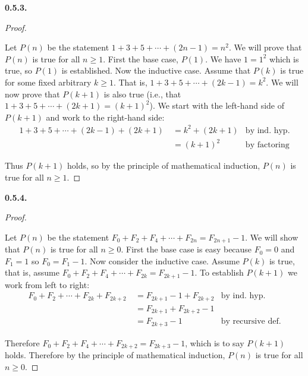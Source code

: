 \documentclass[10pt,]{book}
\theoremstyle{plain}
\theoremstyle{definition}
\theoremstyle{definition}
\theoremstyle{definition}
\theoremstyle{definition}
\numberwithin{equation}{chapter}
\newcommand{\amp}{&}
\begin{document}
\par\smallskip
\noindent\textbf{0.5.3.} \begin{proof}\hypertarget{proof-7}{}
\hypertarget{p-439}{}%
Let \(P(n)\) be the statement \(1+3 +5 + \cdots + (2n-1) = n^2\). We will prove that \(P(n)\) is true for all \(n \ge 1\). First the base case, \(P(1)\). We have \(1 = 1^2\) which is true, so \(P(1)\) is established. Now the inductive case. Assume that \(P(k)\) is true for some fixed arbitrary \(k \ge 1\). That is, \(1 + 3 + 5 + \cdots + (2k-1) = k^2\). We will now prove that \(P(k+1)\) is also true (i.e., that \(1 + 3 + 5 + \cdots + (2k+1) = (k+1)^2\)). We start with the left-hand side of \(P(k+1)\) and work to the right-hand side:%
\begin{align*}
1 + 3 + 5 + \cdots + (2k-1) + (2k+1) ~ \amp = k^2 + (2k+1) \amp \text{by ind. hyp.}\\
\amp = (k+1)^2 \amp \text{by factoring}
\end{align*}
%
\par
\hypertarget{p-440}{}%
Thus \(P(k+1)\) holds, so by the principle of mathematical induction, \(P(n)\) is true for all \(n \ge 1\).%
\end{proof}
\par\smallskip
\noindent\textbf{0.5.4.} \begin{proof}\hypertarget{proof-8}{}
\hypertarget{p-442}{}%
Let \(P(n)\) be the statement \(F_0 + F_2 + F_4 + \cdots + F_{2n} = F_{2n+1} - 1\). We will show that \(P(n)\) is true for all \(n \ge 0\). First the base case is easy because \(F_0 = 0\) and \(F_1 = 1\) so \(F_0 = F_1 - 1\). Now consider the inductive case. Assume \(P(k)\) is true, that is, assume \(F_0 + F_2 + F_4 + \cdots + F_{2k} = F_{2k+1} - 1\). To establish \(P(k+1)\) we work from left to right:%
\begin{align*}
F_0 + F_2 + \cdots + F_{2k} + F_{2k+2} ~ \amp = F_{2k+1} - 1 + F_{2k+2} \amp \text{by ind. hyp.}\\
\amp = F_{2k+1} + F_{2k+2} - 1 \amp\\
\amp = F_{2k+3} - 1 \amp \text{by recursive def.}
\end{align*}
%
\par
\hypertarget{p-443}{}%
Therefore \(F_0 + F_2 + F_4 + \cdots + F_{2k+2} = F_{2k+3} - 1\), which is to say \(P(k+1)\) holds. Therefore by the principle of mathematical induction, \(P(n)\) is true for all \(n \ge 0\).%
\end{proof}
\par\smallskip
\end{document}
